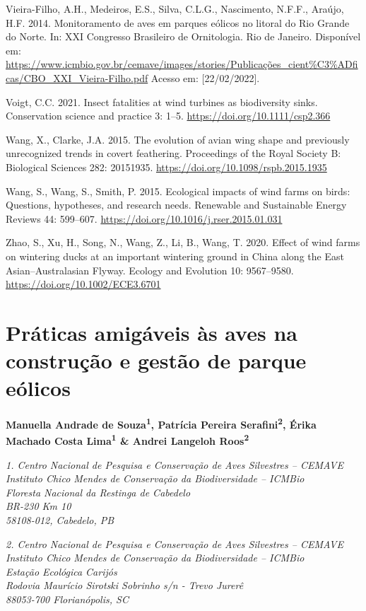 \documentclass[
  oneside]{scrbook}
\begin{document}
Vieira-Filho, A.H., Medeiros, E.S., Silva, C.L.G., Nascimento, N.F.F., Araújo, H.F. 2014. Monitoramento de aves em parques eólicos no litoral do Rio Grande do Norte. In: XXI Congresso Brasileiro de Ornitologia. Rio de Janeiro. Disponível em: \url{https://www.icmbio.gov.br/cemave/images/stories/Publicações_cient\%C3\%ADficas/CBO_XXI_Vieira-Filho.pdf} Acesso em: {[}22/02/2022{]}.

Voigt, C.C. 2021. Insect fatalities at wind turbines as biodiversity sinks. Conservation science and practice 3: 1--5. \url{https://doi.org/10.1111/csp2.366}

Wang, X., Clarke, J.A. 2015. The evolution of avian wing shape and previously unrecognized trends in covert feathering. Proceedings of the Royal Society B: Biological Sciences 282: 20151935. \url{https://doi.org/10.1098/rspb.2015.1935}

Wang, S., Wang, S., Smith, P. 2015. Ecological impacts of wind farms on birds: Questions, hypotheses, and research needs. Renewable and Sustainable Energy Reviews 44: 599--607. \url{https://doi.org/10.1016/j.rser.2015.01.031}

Zhao, S., Xu, H., Song, N., Wang, Z., Li, B., Wang, T. 2020. Effect of wind farms on wintering ducks at an important wintering ground in China along the East Asian--Australasian Flyway. Ecology and Evolution 10: 9567--9580. \url{https://doi.org/10.1002/ECE3.6701}

\hypertarget{cap5}{%
\chapter{Práticas amigáveis às aves na construção e gestão de parque eólicos}\label{cap5}}

\pagestyle{headings}

\textbf{Manuella Andrade de Souza\textsuperscript{1}, Patrícia Pereira Serafini\textsuperscript{2}, Érika Machado Costa Lima\textsuperscript{1} \& Andrei Langeloh Roos\textsuperscript{2}}

\emph{1. Centro Nacional de Pesquisa e Conservação de Aves Silvestres -- CEMAVE}\\
\emph{Instituto Chico Mendes de Conservação da Biodiversidade -- ICMBio}\\
\emph{Floresta Nacional da Restinga de Cabedelo}\\
\emph{BR-230 Km 10}\\
\emph{58108-012, Cabedelo, PB}

\emph{2. Centro Nacional de Pesquisa e Conservação de Aves Silvestres -- CEMAVE}\\
\emph{Instituto Chico Mendes de Conservação da Biodiversidade -- ICMBio}\\
\emph{Estação Ecológica Carijós}\\
\emph{Rodovia Maurício Sirotski Sobrinho s/n - Trevo Jurerê}\\
\emph{88053-700 Florianópolis, SC}
\end{document}
